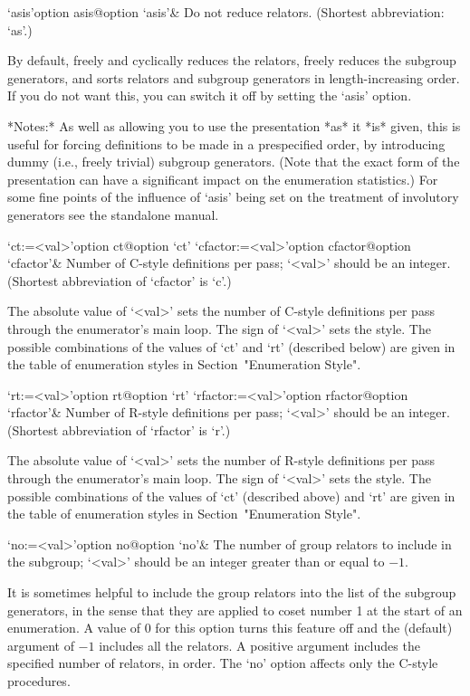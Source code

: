 \beginitems

\>`asis'{option asis}@{option `asis'}&
Do not reduce relators. (Shortest abbreviation: `as'.)

By default, {\ACE} freely  and cyclically reduces the relators, freely
reduces  the  subgroup generators,  and  sorts  relators and  subgroup
generators in length-increasing  order.  If you do not  want this, you
can switch it off by setting the `asis' option.

*Notes:* As well as allowing you  to use the presentation *as* it *is*
given,  this  is  useful for  forcing  definitions  to  be made  in  a
prespecified  order,  by  introducing  dummy  (i.e.,  freely  trivial)
subgroup generators.   (Note that the  exact form of  the presentation
can  have a significant  impact on  the enumeration  statistics.)  For
some fine points of the influence of `asis' being set on the treatment
of involutory generators see the {\ACE} standalone manual.

\>`ct:=<val>'{option ct}@{option `ct'}
\>`cfactor:=<val>'{option cfactor}@{option `cfactor'}&
Number of C-style definitions per pass; `<val>' should be an  integer. 
(Shortest abbreviation of `cfactor' is `c'.)

The absolute value of `<val>' sets the
number of C-style definitions per  pass through  the enumerator's main
loop. The sign of `<val>'  sets the  style. The possible  combinations
of the values of `ct' and  `rt'  (described below)  are  given in  the
table of  enumeration styles in Section~"Enumeration Style".

\>`rt:=<val>'{option rt}@{option `rt'}
\>`rfactor:=<val>'{option rfactor}@{option `rfactor'}&
Number of R-style definitions per pass; `<val>' should be an  integer. 
(Shortest abbreviation of `rfactor' is `r'.)

The absolute value of `<val>' sets the
number of R-style definitions per  pass through  the enumerator's main
loop. The sign of `<val>'  sets the  style. The possible  combinations
of the values of `ct' (described above)  and  `rt'  are  given in  the
table of  enumeration styles in Section~"Enumeration Style".

\>`no:=<val>'{option no}@{option `no'}&
The number of group relators to include in the subgroup;  
`<val>' should be an integer greater than or equal to $-1$.

It is sometimes helpful to include the group relators into the list of
the subgroup generators, in the sense that they are applied  to  coset
number 1 at the start of an enumeration. A value of 0 for this  option
turns this feature off and the (default) argument of $-1$ includes all
the relators. A positive argument includes  the  specified  number  of
relators,  in  order.  The  `no'  option  affects  only  the   C-style
procedures.

